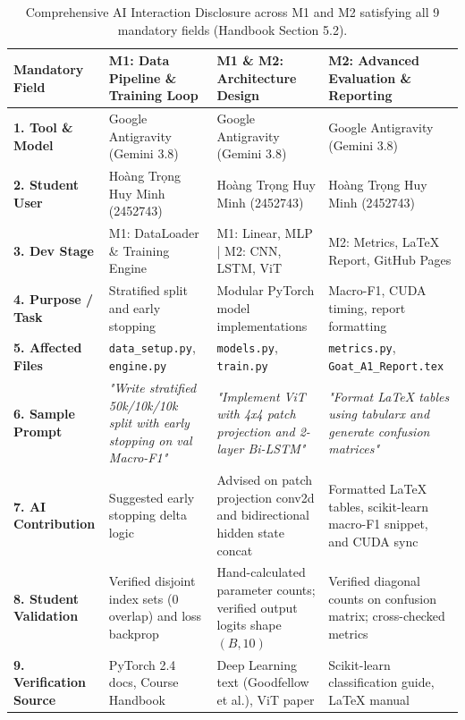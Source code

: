 \documentclass[11pt, a4paper]{article}
\begin{document}
\begin{table}[H]
  \centering
  \caption{Comprehensive AI Interaction Disclosure across M1 and M2 satisfying all 9 mandatory fields (Handbook Section 5.2).}
  \label{tab:ai_log}
  \footnotesize
  \begin{tabularx}{\textwidth}{@{}p{2.6cm} X X X@{}}
    \toprule
    \textbf{Mandatory Field} & \textbf{M1: Data Pipeline \& Training Loop} & \textbf{M1 \& M2: Architecture Design} & \textbf{M2: Advanced Evaluation \& Reporting} \\
    \midrule
    \textbf{1. Tool \& Model} & Google Antigravity (Gemini 3.8) & Google Antigravity (Gemini 3.8) & Google Antigravity (Gemini 3.8) \\
    \textbf{2. Student User} & Hoàng Trọng Huy Minh (2452743) & Hoàng Trọng Huy Minh (2452743) & Hoàng Trọng Huy Minh (2452743) \\
    \textbf{3. Dev Stage} & M1: DataLoader \& Training Engine & M1: Linear, MLP | M2: CNN, LSTM, ViT & M2: Metrics, LaTeX Report, GitHub Pages \\
    \textbf{4. Purpose / Task} & Stratified split and early stopping & Modular PyTorch model implementations & Macro-F1, CUDA timing, report formatting \\
    \textbf{5. Affected Files} & \texttt{data\_setup.py}, \texttt{engine.py} & \texttt{models.py}, \texttt{train.py} & \texttt{metrics.py}, \texttt{Goat\_A1\_Report.tex} \\
    \textbf{6. Sample Prompt} & \textit{"Write stratified 50k/10k/10k split with early stopping on val Macro-F1"} & \textit{"Implement ViT with 4x4 patch projection and 2-layer Bi-LSTM"} & \textit{"Format LaTeX tables using tabularx and generate confusion matrices"} \\
    \textbf{7. AI Contribution} & Suggested early stopping delta logic & Advised on patch projection conv2d and bidirectional hidden state concat & Formatted LaTeX tables, scikit-learn macro-F1 snippet, and CUDA sync \\
    \textbf{8. Student Validation} & Verified disjoint index sets ($0$ overlap) and loss backprop & Hand-calculated parameter counts; verified output logits shape $(B, 10)$ & Verified diagonal counts on confusion matrix; cross-checked metrics \\
    \textbf{9. Verification Source} & PyTorch 2.4 docs, Course Handbook & Deep Learning text (Goodfellow et al.), ViT paper & Scikit-learn classification guide, LaTeX manual \\
    \bottomrule
  \end{tabularx}
\end{table}
\end{document}
